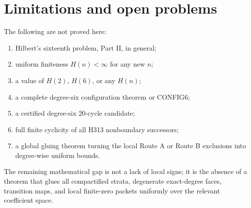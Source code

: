 \documentclass[11pt]{article}
\begin{document}
\section{Limitations and open problems}
The following are not proved here:
\begin{enumerate}
\item Hilbert's sixteenth problem, Part II, in general;
\item uniform finiteness \(H(n)<\infty\) for any new \(n\);
\item a value of \(H(2)\), \(H(6)\), or any \(H(n)\);
\item a complete degree-six configuration theorem or CONFIG6;
\item a certified degree-six 20-cycle candidate;
\item full finite cyclicity of all H313 nonboundary successors;
\item a global gluing theorem turning the local Route A or Route B exclusions into degree-wise uniform bounds.
\end{enumerate}
The remaining mathematical gap is not a lack of local signs; it is the absence of a theorem that glues all compactified strata, degenerate exact-degree faces, transition maps, and local finite-zero packets uniformly over the relevant coefficient space.

\appendix
\end{document}
